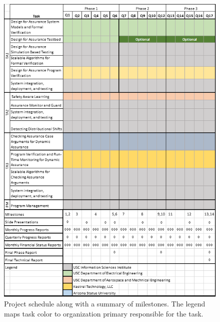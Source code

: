 \begin{figure}[tbhp]
\begin{center}
\includegraphics[width=.95\textwidth]{figs/Safeguard_Schedule_V6}
\end{center}
\vspace{-.2in}\caption{Project schedule along with a summary of milestones.  The legend maps task color to organization primary responsible for the task. } 
\label{fig:sandm}
\end{figure}
 